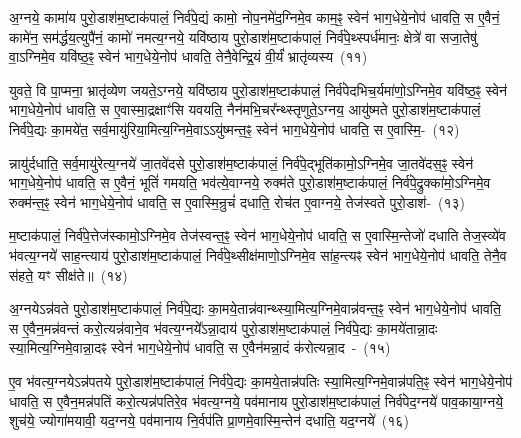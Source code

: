 {\anuvakamend[{व्र॒तप॑तये॒ निशि॑ताया॒न्निर्व॑पे॒त्पुरु॑षाः सङ्ग्रा॒मन्न च॒त्वारि॑ च}]}

अ॒ग्नये॒ कामा॑य पुरो॒डाश॑\-म॒ष्टा\-क॑पालं॒ निर्व॑पे॒द्यं कामो॒ नोप॒नमे॑द॒ग्निमे॒व काम॒ꣴ॒ स्वेन॑ भाग॒\-धेये॒नोप॑ धावति॒ स ए॒वैनं॒ कामे॑न॒ सम॑र्द्धय॒त्युपै॑नं॒ कामो॑ नमत्य॒ग्नये॒ यवि॑ष्ठाय पुरो॒डाश॑\-म॒ष्टा\-क॑पालं॒ निर्व॑पे॒थ्स्पर्ध॑मानः॒ क्षेत्रे॑ वा सजा॒तेषु॑ वा॒\-ऽग्निमे॒व यवि॑ष्ठ॒ꣴ॒ स्वेन॑ भाग॒\-धेये॒नोप॑ धावति॒ तेनै॒वेन्द्रि॒यं वी॒र्यं॑ भ्रातृ॑व्यस्य~(११)\ip

युवते॒ वि पा॒प्मना॒ भ्रातृ॑व्येण जयते॒\-ऽग्नये॒ यवि॑ष्ठाय पुरो॒डाश॑\-म॒ष्टा\-क॑पालं॒ निर्व॑पेदभिच॒र्यमा॑णो॒\-ऽग्निमे॒व यवि॑ष्ठ॒ꣴ॒ स्वेन॑ भाग॒\-धेये॒नोप॑ धावति॒ स ए॒वास्मा॒द्रक्षाꣳ॑सि यवयति॒ नैन॑मभि॒चर᳚न्थ्स्तृणुते॒\-ऽग्नय॒ आयु॑ष्मते पुरो॒डाश॑\-म॒ष्टा\-क॑पालं॒ निर्व॑पे॒द्यः का॒मये॑त॒ सर्व॒मायु॑रिया॒मित्य॒ग्निमे॒वा\-ऽऽ\-यु॑ष्मन्त॒ꣴ॒ स्वेन॑ भाग॒\-धेये॒नोप॑ धावति॒ स ए॒वास्मि॒-~(१२)\ip

न्नायु॑र्दधाति॒ सर्व॒मायु॑रेत्य॒ग्नये॑ जा॒तवे॑दसे पुरो॒डाश॑\-म॒ष्टा\-क॑पालं॒ निर्व॑पे॒द्भूति॑कामो॒\-ऽग्निमे॒व जा॒तवे॑दस॒ꣴ॒ स्वेन॑ भाग॒\-धेये॒नोप॑ धावति॒ स ए॒वैनं॒ भूतिं॑ गमयति॒ भव॑त्ये॒वाग्नये॒ रुक्म॑ते पुरो॒डाश॑\-म॒ष्टा\-क॑पालं॒ निर्व॑पे॒द्रुक्का॑मो॒\-ऽग्निमे॒व रुक्म॑न्त॒ꣴ॒ स्वेन॑ भाग॒\-धेये॒नोप॑ धावति॒ स ए॒वास्मि॒न्रुचं॑ दधाति॒ रोच॑त ए॒वाग्नये॒ तेज॑स्वते पुरो॒डाश॑-~(१३)\ip

म॒ष्टा\-क॑पालं॒ निर्व॑पे॒त्तेज॑स्कामो॒\-ऽग्निमे॒व तेज॑स्वन्त॒ꣴ॒ स्वेन॑ भाग॒\-धेये॒नोप॑ धावति॒ स ए॒वास्मि॒न्तेजो॑ दधाति तेज॒स्व्ये॑व भ॑वत्य॒ग्नये॑ साह॒न्त्याय॑ पुरो॒डाश॑\-म॒ष्टा\-क॑पालं॒ निर्व॑पे॒थ्सीक्ष॑माणो॒\-ऽग्निमे॒व सा॑ह॒न्त्यꣴ स्वेन॑ भाग॒\-धेये॒नोप॑ धावति॒ तेनै॒व स॑हते॒ यꣳ सीक्ष॑ते॥~(१४)\ip

{\anuvakamend[{भ्रातृ॑व्यस्यास्मि॒न्तेज॑स्वते पुरो॒डाश॑\-म॒ष्टात्रिꣳ॑शच्च}]}

अ॒ग्नये\-ऽन्न॑वते पुरो॒डाश॑\-म॒ष्टा\-क॑पालं॒ निर्व॑पे॒द्यः का॒मये॒तान्न॑\-वान्थ्स्या॒मित्य॒ग्नि\-मे॒वान्न॑वन्त॒ꣴ॒ स्वेन॑ भाग॒\-धेये॒नोप॑ धावति॒ स ए॒वैन॒मन्न॑वन्तं करो॒त्यन्न॑वाने॒व भ॑वत्य॒ग्नये᳚\-ऽन्ना॒दाय॑ पुरो॒डाश॑\-म॒ष्टाक॑पालं॒ निर्व॑पे॒द्यः का॒मये॑तान्ना॒दः स्या॒मित्य॒ग्निमे॒वान्ना॒दꣴ स्वेन॑ भाग॒\-धेये॒नोप॑ धावति॒ स ए॒वैन॑मन्ना॒दं क॑रोत्यन्ना॒द~-~(१५)\ip

ए॒व भ॑वत्य॒ग्नये\-ऽन्न॑पतये पुरो॒डाश॑\-म॒ष्टा\-क॑पालं॒ निर्व॑पे॒द्यः का॒मये॒तान्न॑पतिः स्या॒मित्य॒ग्नि\-मे॒वान्न॑\-पति॒ꣴ॒ स्वेन॑ भाग॒\-धेये॒नोप॑ धावति॒ स ए॒वैन॒मन्न॑पतिं करो॒त्यन्न॑पतिरे॒व भ॑वत्य॒ग्नये॒ पव॑मानाय पुरो॒डाश॑\-म॒ष्टा\-क॑पालं॒ निर्व॑पेद॒ग्नये॑ पाव॒काया॒ग्नये॒ शुच॑ये॒ ज्योगा॑मयावी॒ यद॒ग्नये॒ पव॑मानाय नि॒र्वप॑ति प्रा॒णमे॒वास्मि॒न्तेन॑ दधाति॒ यद॒ग्नये॑~(१६)\ip

